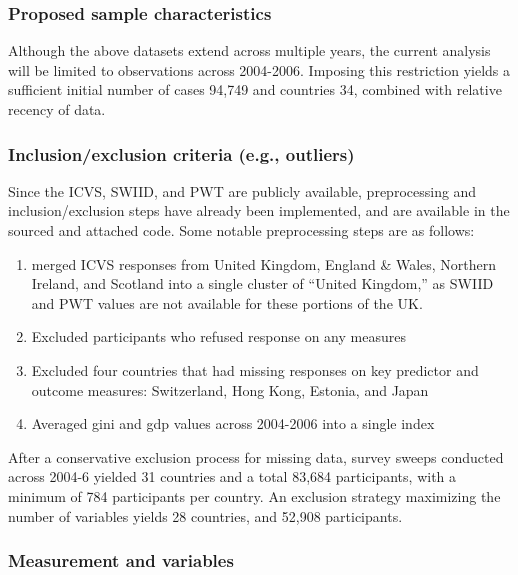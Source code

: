 \documentclass[
  english,
  man]{apa6}
\begin{document}
\hypertarget{proposed-sample-characteristics}{%
\subsubsection{Proposed sample characteristics}\label{proposed-sample-characteristics}}

Although the above datasets extend across multiple years, the current analysis will be limited to observations across 2004-2006. Imposing this restriction yields a sufficient initial number of cases 94,749 and countries 34, combined with relative recency of data.

\hypertarget{inclusionexclusion-criteria-e.g.-outliers}{%
\subsubsection{Inclusion/exclusion criteria (e.g., outliers)}\label{inclusionexclusion-criteria-e.g.-outliers}}

Since the ICVS, SWIID, and PWT are publicly available, preprocessing and inclusion/exclusion steps have already been implemented, and are available in the sourced and attached code. Some notable preprocessing steps are as follows:

\begin{enumerate}
\def\labelenumi{\arabic{enumi}.}
\item
  merged ICVS responses from United Kingdom, England \& Wales, Northern Ireland, and Scotland into a single cluster of ``United Kingdom,'' as SWIID and PWT values are not available for these portions of the UK.
\item
  Excluded participants who refused response on any measures
\item
  Excluded four countries that had missing responses on key predictor and outcome measures: Switzerland, Hong Kong, Estonia, and Japan
\item
  Averaged gini and gdp values across 2004-2006 into a single index
\end{enumerate}

After a conservative exclusion process for missing data, survey sweeps conducted across 2004-6 yielded 31 countries and a total 83,684 participants, with a minimum of 784 participants per country. An exclusion strategy maximizing the number of variables yields 28 countries, and 52,908 participants.

\hypertarget{measurement-and-variables}{%
\subsubsection{Measurement and variables}\label{measurement-and-variables}}
\end{document}
